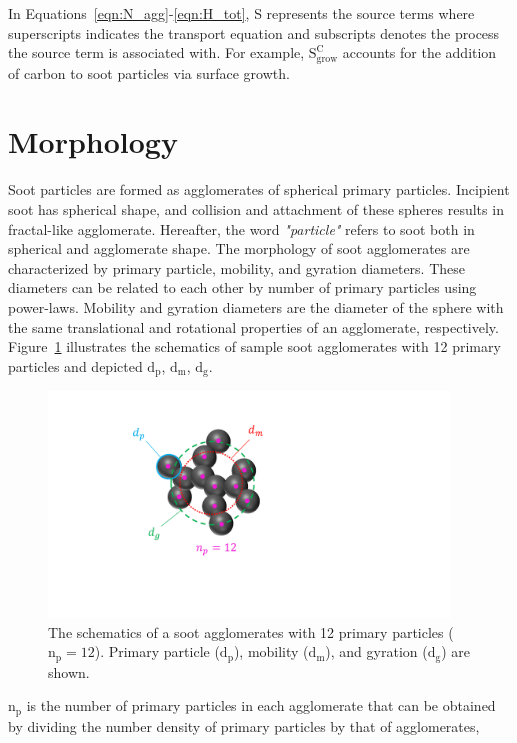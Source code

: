In Equations~\eqref{eqn:N_agg}-\eqref{eqn:H_tot}, S represents the source terms where superscripts indicates the transport equation and subscripts denotes the process the source term is associated with. For example, $\mathrm{S^C_{grow}}$ accounts for the addition of carbon to soot particles via surface growth.

\section{Morphology}
\label{sec:morphology}
Soot particles are formed as agglomerates of spherical primary particles. Incipient soot has spherical shape, and collision and attachment of these spheres results in fractal-like agglomerate. Hereafter, the word \textit{"particle"} refers to soot both in spherical and agglomerate shape.
The morphology of soot agglomerates are characterized by primary particle, mobility, and gyration diameters. These diameters can be related to each other by number of primary particles using power-laws. Mobility and gyration diameters are the diameter of the sphere with the same translational and rotational properties of an agglomerate, respectively. Figure~\ref{fig:Morphology} illustrates the schematics of sample soot agglomerates with 12 primary particles and depicted $\mathrm{d_p}$, $\mathrm{d_m}$, $\mathrm{d_g}$.
\begin{figure}[!htbp]
	\centering
	\includegraphics[height=60mm, ]{Figures/Morphology.pdf}
	\caption{The schematics of a soot agglomerates with 12 primary particles ($\mathrm{n_p=12}$). Primary particle ($\mathrm{d_p}$), mobility ($\mathrm{d_m}$), and gyration ($\mathrm{d_g}$) are shown.}
	\label{fig:Morphology}
\end{figure} 

$\mathrm{n_p}$ is the number of primary particles in each agglomerate that can be obtained by dividing the number density of primary particles by that of agglomerates,

